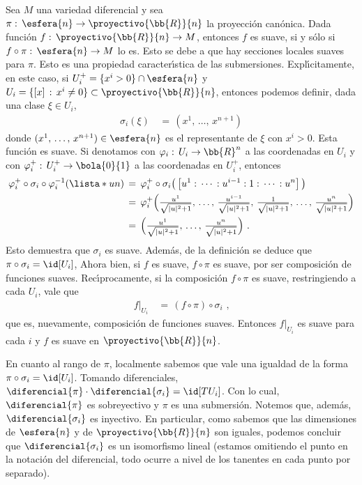 \begin{ejemplo}
	Sea $M$ una variedad diferencial y sea $\pi:\,\esfera{n}\rightarrow%
	\proyectivo{\bb{R}}{n}$ la proyecci\'{o}n can\'{o}nica.
	Dada funci\'{o}n $f:\,\proyectivo{\bb{R}}{n}\rightarrow M$,
	entonces $f$ es suave, si y s\'{o}lo si
	$f\circ\pi:\,\esfera{n}\rightarrow M$ lo es. Esto se debe a que
	hay secciones locales suaves para $\pi$. Esto es una propiedad
	caracter\'{\i}stica de las submersiones. Expl\'{\i}citamente, en
	este caso, si $U_{i}^{+}=\{x^{i}>0\}\cap\esfera{n}$ y
	$U_{i}=\{[x]\,:\,x^{i}\not =0\}\subset\proyectivo{\bb{R}}{n}$,
	entonces podemos definir, dada una clase $\xi\in U_{i}$,
	\begin{align*}
		\sigma_{i}(\xi) & \,=\,(x^{1},\,\dots,\,x^{n+1})
	\end{align*}
	donde $(x^{1},\,\dots,\,x^{n+1})\in\esfera{n}$ es el representante
	de $\xi$ con $x^{i}>0$. Esta funci\'{o}n es suave. Si
	denotamos con $\varphi_{i}:\,U_{i}\rightarrow\bb{R}^{n}$ a las
	coordenadas en $U_{i}$ y con
	$\varphi_{i}^{+}:\,U_{i}^{+}\rightarrow\bola{0}{1}$ a las coordenadas
	en $U_{i}^{+}$, entonces
	\begin{align*}
		\varphi_{i}^{+}\circ\sigma_{i}\circ\varphi_{i}^{-1}
		(\lista*{u}{n}) & \,=\,
			\varphi_{i}^{+}\circ\sigma_{i}\big(
			\left[u^{1}:\,\cdots\,:u^{i-1}:1:\,\cdots\,:u^{n}
				\right]\big) \\
		& \,=\,\varphi_{i}^{+}\Big(
			\tfrac{u^{1}}{\sqrt{|u|^{2}+1}},\,\dots,\,
			\tfrac{u^{i-1}}{\sqrt{|u|^{2}+1}},\,
			\tfrac{1}{\sqrt{|u|^{2}+1}},\,\dots,\,
			\tfrac{u^{n}}{\sqrt{|u|^{2}+1}}\Big) \\
		& \,=\,\Big(\tfrac{u^{1}}{\sqrt{|u|^{2}+1}},\,\dots,\,
			\tfrac{u^{n}}{\sqrt{|u|^{2}+1}}
			\Big)
		\text{ .}
	\end{align*}
	Esto demuestra que $\sigma_{i}$ es suave. Adem\'{a}s, de la
	definici\'{o}n se deduce que $\pi\circ\sigma_{i}=\id[U_{i}]$,
	Ahora bien, si $f$ es suave, $f\circ\pi$ es suave, por ser
	composici\'{o}n de funciones suaves. Rec\'{\i}procamente, si
	la composici\'{o}n $f\circ\pi$ es suave, restringiendo a cada
	$U_{i}$, vale que
	\begin{align*}
		\left.f\right|_{U_{i}} & \,=\,(f\circ\pi)\circ\sigma_{i}
		\text{ ,}
	\end{align*}
	que es, nuevamente, composici\'{o}n de funciones suaves. Entonces
	$f|_{U_{i}}$ es suave para cada $i$ y $f$ es suave en
	$\proyectivo{\bb{R}}{n}$.

	En cuanto al rango de $\pi$, localmente sabemos que vale una igualdad
	de la forma $\pi\circ\sigma_{i}=\id[U_{i}]$. Tomando diferenciales,
	$\diferencial{\pi}\cdot\diferencial{\sigma_{i}} =\id[TU_{i}]$.
	Con lo cual, $\diferencial{\pi}$ es sobreyectivo y $\pi$ es una
	submersi\'{o}n. Notemos que, adem\'{a}s, $\diferencial{\sigma_{i}}$
	es inyectivo. En particular, como sabemos que las dimensiones
	de $\esfera{n}$ y de $\proyectivo{\bb{R}}{n}$ son iguales, podemos
	concluir que $\diferencial{\sigma_{i}}$ es un isomorfismo lineal
	(estamos omitiendo el punto en la notaci\'{o}n del diferencial, todo
	ocurre a nivel de los tanentes en cada punto por separado).


\end{ejemplo}
